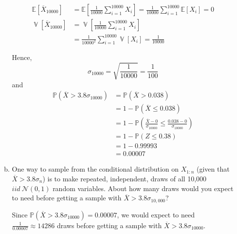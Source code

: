 \documentclass[12pt]{article}
\renewcommand{\P}{\mathbb{P}}
\newcommand{\E}{\mathbb{E}}
\renewcommand{\bar}[1]{\overline{#1}}
\DeclareMathOperator{\Var}{\mathbb{V}}
\begin{document}
\begin{enumerate}[1.]
\begin{enumerate}[(a)]
		            \color{blue}
		            \begin{align*}
			            \E[\bar X_{10000}]   & = \E\left[\frac{1}{10000}\sum_{i=1}^{10000} X_i\right] = \frac{1}{10000}\sum_{i=1}^{10000} \E[X_i] = 0 \\
			            \Var[\bar X_{10000}] & = \Var\left[\frac{1}{10000}\sum_{i=1}^{10000} X_i\right]                                               \\
			                                 & = \frac{1}{10000^2}\sum_{i=1}^{10000} \Var[X_i] = \frac{1}{10000}
		            \end{align*}

		            Hence,
		            \[\sigma_{10000} = \sqrt{\frac{1}{10000}} = \frac{1}{100}\]
		            and
		            \begin{align*}
			            \P(\bar X > 3.8\sigma_{10000}) & = \P(\bar X > 0.038)                                                                         \\
			                                           & = 1 - \P(\bar X \leq 0.038)                                                                  \\
			                                           & = 1 - \P\left(\frac{\bar X - 0}{\sigma_{10000}} \leq \frac{0.038 - 0}{\sigma_{10000}}\right) \\
			                                           & = 1 - \P(Z \leq 0.38)                                                                        \\
			                                           & = 1 - 0.99993                                                                                \\
			                                           & = \boxed{0.00007}
		            \end{align*}

		            \color{black}

		      \item One way to sample from the conditional distribution on $X_{1:n}$
		            (given that $\bar{X} >3.8\sigma_n$) is to make repeated, independent, draws of all 10,000
		            $iid\ {\mathcal N}(0,1)$ random variables. About how many draws would you expect to need before getting a sample with
		            $\bar{X}>3.8\sigma_{10,000}$?

		            \color{blue}
		            Since $\P(\bar X > 3.8\sigma_{10000}) = 0.00007$, we would expect to need $\frac{1}{0.00007} \approx 14286$ draws before getting a sample with $\bar{X} > 3.8\sigma_{10000}$.
		            \color{black}


\end{enumerate}
\end{enumerate}
\end{document}
